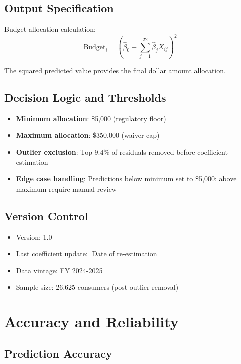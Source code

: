 \subsection{Output Specification}

Budget allocation calculation:
\begin{equation}
\text{Budget}_i = \left(\hat{\beta}_0 + \sum_{j=1}^{22} \hat{\beta}_j X_{ij}\right)^2
\end{equation}

The squared predicted value provides the final dollar amount allocation.

\subsection{Decision Logic and Thresholds}

\begin{itemize}
    \item \textbf{Minimum allocation}: \$5,000 (regulatory floor)
    \item \textbf{Maximum allocation}: \$350,000 (waiver cap)
    \item \textbf{Outlier exclusion}: Top 9.4\% of residuals removed before coefficient estimation
    \item \textbf{Edge case handling}: Predictions below minimum set to \$5,000; above maximum require manual review
\end{itemize}

\subsection{Version Control}
\begin{itemize}
    \item Version: 1.0
    \item Last coefficient update: [Date of re-estimation]
    \item Data vintage: FY 2024-2025
    \item Sample size: 26,625 consumers (post-outlier removal)
\end{itemize}

\section{Accuracy and Reliability}

\subsection{Prediction Accuracy}

